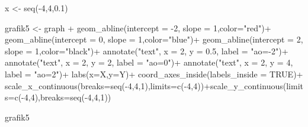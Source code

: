 \documentclass[
  letterpaper,
  DIV=11,
  numbers=noendperiod]{scrartcl}
\newenvironment{Shaded}{\begin{snugshade}}{\end{snugshade}}
\newcommand{\AttributeTok}[1]{\textcolor[rgb]{0.40,0.45,0.13}{#1}}
\newcommand{\ConstantTok}[1]{\textcolor[rgb]{0.56,0.35,0.01}{#1}}
\newcommand{\DecValTok}[1]{\textcolor[rgb]{0.68,0.00,0.00}{#1}}
\newcommand{\FloatTok}[1]{\textcolor[rgb]{0.68,0.00,0.00}{#1}}
\newcommand{\FunctionTok}[1]{\textcolor[rgb]{0.28,0.35,0.67}{#1}}
\newcommand{\NormalTok}[1]{\textcolor[rgb]{0.00,0.23,0.31}{#1}}
\newcommand{\OtherTok}[1]{\textcolor[rgb]{0.00,0.23,0.31}{#1}}
\newcommand{\SpecialCharTok}[1]{\textcolor[rgb]{0.37,0.37,0.37}{#1}}
\newcommand{\StringTok}[1]{\textcolor[rgb]{0.13,0.47,0.30}{#1}}
\begin{document}
\begin{Shaded}
\begin{Highlighting}[]
\NormalTok{x }\OtherTok{\textless{}{-}} \FunctionTok{seq}\NormalTok{(}\SpecialCharTok{{-}}\DecValTok{4}\NormalTok{,}\DecValTok{4}\NormalTok{,}\FloatTok{0.1}\NormalTok{)}

\NormalTok{grafik5 }\OtherTok{\textless{}{-}}\NormalTok{ graph }\SpecialCharTok{+}
  \FunctionTok{geom\_abline}\NormalTok{(}\AttributeTok{intercept =} \SpecialCharTok{{-}}\DecValTok{2}\NormalTok{, }\AttributeTok{slope =} \DecValTok{1}\NormalTok{,}\AttributeTok{color=}\StringTok{"red"}\NormalTok{)}\SpecialCharTok{+}
  \FunctionTok{geom\_abline}\NormalTok{(}\AttributeTok{intercept =} \DecValTok{0}\NormalTok{, }\AttributeTok{slope =} \DecValTok{1}\NormalTok{,}\AttributeTok{color=}\StringTok{"blue"}\NormalTok{)}\SpecialCharTok{+}
  \FunctionTok{geom\_abline}\NormalTok{(}\AttributeTok{intercept =} \DecValTok{2}\NormalTok{, }\AttributeTok{slope =} \DecValTok{1}\NormalTok{,}\AttributeTok{color=}\StringTok{"black"}\NormalTok{)}\SpecialCharTok{+}
  \FunctionTok{annotate}\NormalTok{(}\StringTok{"text"}\NormalTok{, }\AttributeTok{x =} \DecValTok{2}\NormalTok{, }\AttributeTok{y =} \FloatTok{0.5}\NormalTok{, }\AttributeTok{label =} \StringTok{"ao={-}2"}\NormalTok{)}\SpecialCharTok{+}
  \FunctionTok{annotate}\NormalTok{(}\StringTok{"text"}\NormalTok{, }\AttributeTok{x =} \DecValTok{2}\NormalTok{, }\AttributeTok{y =} \DecValTok{2}\NormalTok{, }\AttributeTok{label =} \StringTok{"ao=0"}\NormalTok{)}\SpecialCharTok{+}
  \FunctionTok{annotate}\NormalTok{(}\StringTok{"text"}\NormalTok{, }\AttributeTok{x =} \DecValTok{2}\NormalTok{, }\AttributeTok{y =} \DecValTok{4}\NormalTok{, }\AttributeTok{label =} \StringTok{"ao=2"}\NormalTok{)}\SpecialCharTok{+}
  \FunctionTok{labs}\NormalTok{(}\AttributeTok{x=}\StringTok{\textquotesingle{}X\textquotesingle{}}\NormalTok{,}\AttributeTok{y=}\StringTok{\textquotesingle{}Y\textquotesingle{}}\NormalTok{)}\SpecialCharTok{+}
  \FunctionTok{coord\_axes\_inside}\NormalTok{(}\AttributeTok{labels\_inside =} \ConstantTok{TRUE}\NormalTok{)}\SpecialCharTok{+}
  \FunctionTok{scale\_x\_continuous}\NormalTok{(}\AttributeTok{breaks=}\FunctionTok{seq}\NormalTok{(}\SpecialCharTok{{-}}\DecValTok{4}\NormalTok{,}\DecValTok{4}\NormalTok{,}\DecValTok{1}\NormalTok{),}\AttributeTok{limits=}\FunctionTok{c}\NormalTok{(}\SpecialCharTok{{-}}\DecValTok{4}\NormalTok{,}\DecValTok{4}\NormalTok{))}\SpecialCharTok{+}\FunctionTok{scale\_y\_continuous}\NormalTok{(}\AttributeTok{limits=}\FunctionTok{c}\NormalTok{(}\SpecialCharTok{{-}}\DecValTok{4}\NormalTok{,}\DecValTok{4}\NormalTok{),}\AttributeTok{breaks=}\FunctionTok{seq}\NormalTok{(}\SpecialCharTok{{-}}\DecValTok{4}\NormalTok{,}\DecValTok{4}\NormalTok{,}\DecValTok{1}\NormalTok{))}

\NormalTok{grafik5}
\end{Highlighting}
\end{Shaded}
\end{document}
